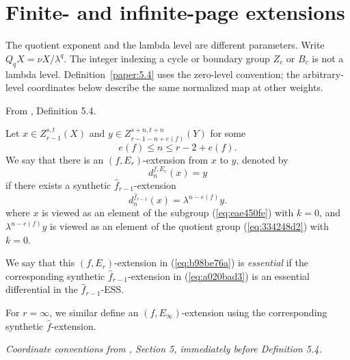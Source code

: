 \section{Finite- and infinite-page extensions}

The quotient exponent and the lambda level are different parameters. Write
$Q_qX=\nu X/\lambda^q$. The integer indexing a cycle or boundary group
$Z_c$ or $B_c$ is not a lambda level. Definition~\ref{paper:5.4} uses
the zero-level convention; the arbitrary-level coordinates below describe
the same normalized map at other weights.

\begin{definition}
\label{paper:5.4}
From \cite{LWX126}, Definition 5.4.\par
\label{def:6c076a33}
    Let $x\in Z^{s,t}_{r-1}(X)$ and $y\in Z^{s+n,t+n}_{r-1-n+e(f)}(Y)$ for some 
    $$e(f)\le n\le r-2+e(f).$$
    We say that there is an $(f,E_r)$-extension from $x$ to $y$, denoted by
    \begin{equation}\label{eq:b98be76a}
    d_{n}^{f,E_r}(x)=y
    \end{equation}
    if there exists a synthetic $\hat f_{r-1}$-extension
    \begin{equation}\label{eq:a020bad3}
        d_{n}^{\hat f_{r-1}}(x)=\lambda^{n-e(f)} y.
    \end{equation}
    where $x$ is viewed as an element of the subgroup (\ref{eq:eae450fe}) with $k=0$, and $\lambda^{n-e(f)} y$ is viewed as an element of the quotient group (\ref{eq:334248d2}) with $k=0$. 

   We say that this $(f,E_r)$-extension in (\ref{eq:b98be76a}) is \emph{essential} if the corresponding synthetic $\hat f_{r-1}$-extension in (\ref{eq:a020bad3}) is an essential differential in the $\hat f_{r-1}$-ESS.
    
    For $r=\infty$, we similar define an $(f,E_\infty)$-extension using the corresponding synthetic $\hat f$-extension.

\textit{Coordinate conventions from \cite{LWX126}, Section 5, immediately before Definition 5.4.}


\end{definition}
